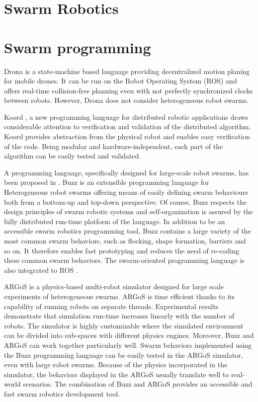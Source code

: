 \label{sec:RevLitt}


\section{Swarm Robotics}


\section{Swarm programming}

Drona \cite{desai2017drona} is a state-machine based language providing decentralized motion planing for mobile drones. It can be run on the Robot Operating System (ROS) and offers real-time collision-free planning even with not perfectly synchronized clocks between robots. However, Drona does not consider heterogeneous robot swarms.

Koord \cite{ghosh2020koord}, a new programming language for distributed robotic applications draws considerable attention to verification and validation of the distributed algorithm. Koord provides abstraction from the physical robot and enables easy verification of the code. Being modular and hardware-independent, each part of the algorithm can be easily tested and validated.

A programming language, specifically designed for large-scale robot swarms, has been proposed in \cite{pinciroliBuzz2016}. Buzz is an extensible programming language for Heterogeneous robot swarms offering means of easily defining swarm behaviours both from a bottom-up and top-down perspective. Of course, Buzz respects the design principles of swarm robotic systems and self-organization is assured by the fully distributed run-time platform of the language. In addition to be an accessible swarm robotics programming tool, Buzz contains a large variety of the most common swarm behaviors, such as flocking, shape formation, barriers and so on. It therefore enables fast prototyping and reduces the need of re-coding these common swarm behaviors. The swarm-oriented programming language is also integrated to ROS \cite{st2017ros}.

ARGoS \cite{Pinciroli:SI2012} is a physics-based multi-robot simulator designed for large scale experiments of heterogeneous swarms. ARGoS is time efficient thanks to its capability of running robots on separate threads. Experimental results demonstrate that simulation run-time increases linearly with the number of robots. The simulator is highly customizable where the simulated environment can be divided into sub-spaces with different physics engines. Moreover, Buzz and ARGoS can work together particularly well. Swarm behaviors implemented using the Buzz programming language can be easily tested in the ARGoS simulator, even with large robot swarms. Because of the physics incorporated in the simulator, the behaviors displayed in the ARGoS usually translate well to real-world scenarios. The combination of Buzz and ARGoS provides an accessible and fast swarm robotics development tool. 






